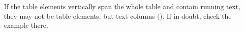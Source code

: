 





\vspace{3mm}
\begin{note}
If the table elements vertically span the whole table and contain running text, they may not be table elements, but text columns (). If in doubt, check the example there.
\end{note}





\tocspace
